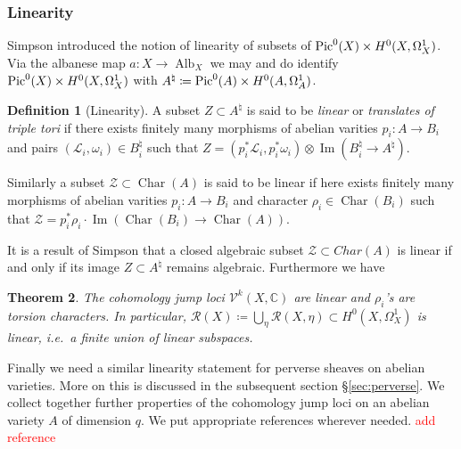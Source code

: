 \documentclass[12pt,reqno]{amsart}
\newtheorem{theorem}{Theorem}
\theoremstyle{question}
\theoremstyle{definition}
\newtheorem{definition}[theorem]{Definition}
\theoremstyle{remark}
\theoremstyle{cited}
\theoremstyle{citeddef}
\DeclareMathOperator{\Alb}{Alb}
\DeclareMathOperator{\Char}{Char}
\DeclareMathOperator{\im}{Im}
\def\Pic{{\rm Pic}}
\newcommand{\sL}{\mathcal{L}}
\newcommand{\sR}{\mathcal{R}}
\newcommand\sV{{\mathcal V}}
\newcommand{\sZ}{\mathcal{Z}}
\newcommand{\bbC}{\mathbb{C}}
\newcommand{\sorry}[1]{\textcolor{red}{#1}}
\begin{document}
\subsubsection{Linearity}
Simpson \cite[p.\ 365]{Sim93a} introduced the notion of linearity of subsets of 
$\Pic^0(X)\times H^0(X,\Omega_X^1)$. Via the albanese
map $a\colon X\to \Alb_X$ we may and do identify
$\Pic^0(X)\times H^0(X,\Omega_X^1)$ with
$A^{\natural} \coloneqq \Pic^0(A)\times H^0(A,\Omega_A^1)$.
\begin{definition}[Linearity]\label{def:linhiggs}
A subset $Z\subset A^{\natural}$ is said to be \textsl{linear}
or \textsl{translates of triple tori}
if there exists finitely many morphisms of abelian varities
$p_i\colon A\to B_i$ and pairs $(\sL_i,\omega_i)\in B_i^{\natural}$
such that $Z= (p_i^*\sL_i,p_i^*\omega_i)\otimes \im(B_i^{\natural}
\to A^{\natural})$.

Similarly a subset $\sZ\subset \Char(A)$ is said to be linear if here exists finitely many morphisms of abelian varities
$p_i\colon A\to B_i$ and character $\rho_i\in \Char(B_i)$
such that $\sZ= p_i^*\rho_i\cdot\im(\Char(B_i)\to \Char(A))$.
\end{definition}




It is a result of Simpson \cite[Theorem 3.1]{Sim93b} that a closed algebraic subset $\sZ \subset Char(A)$ is linear if and only if its image $Z\subset A^{\natural}$ remains algebraic. Furthermore we have 
\begin{theorem}
The cohomology jump loci $\sV^k(X, \bbC)$ are linear and $\rho_i$'s are torsion characters. In particular, $\sR(X)\coloneqq \bigcup_{\eta}\sR(X,\eta)\subset H^0(X,\Omega_X^1)$ is linear, i.e.\ a finite union of linear subspaces.
\label{thm:}
\end{theorem} 

Finally we need a similar linearity statement
for perverse sheaves on abelian varieties. More on this is discussed in the subsequent section \S \ref{sec:perverse}.
We collect together further properties of the
cohomology jump loci on an abelian variety $A$ of dimension $q$.
We put appropriate references wherever needed. \sorry{add reference}
\end{document}
